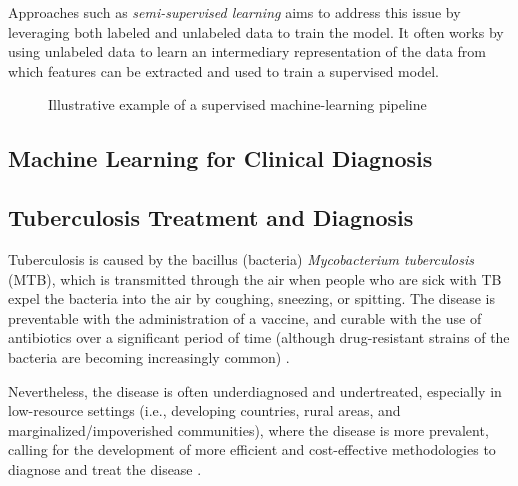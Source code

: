 \documentclass[../main.tex]{subfiles}
\begin{document}
     Approaches such as \textit{semi-supervised learning} aims to address this issue by leveraging both labeled and unlabeled data to train the model. It often works by using unlabeled data to learn an intermediary representation of the data from which features can be extracted and used to train a supervised model. 
    
     \begin{figure}
        \centering
        \resizebox*{1.1\columnwidth}{!}{
            \hspace*{-0.5cm}
            
        }
        \caption{Illustrative example of a supervised machine-learning pipeline}
        \label{fig:supervised_learning}
    \end{figure}


    \subsection{Machine Learning for Clinical Diagnosis}


    \subsection{Tuberculosis Treatment and Diagnosis} \label{sec:tuberculosis_data}

    Tuberculosis is caused by the bacillus (bacteria) \textit{Mycobacterium tuberculosis} (MTB), which is transmitted through the air when people who are sick with TB expel the bacteria into the air by coughing, sneezing, or spitting. The disease is preventable with the administration of a vaccine, and curable with the use of antibiotics over a significant period of time (although drug-resistant strains of the bacteria are becoming increasingly common) \cite{who_tuberculosis_2023}.
    
    Nevertheless, the disease is often underdiagnosed and undertreated, especially in low-resource settings (i.e., developing countries, rural areas, and marginalized/impoverished communities), where the disease is more prevalent, calling for the development of more efficient and cost-effective methodologies to diagnose and treat the disease \cite{who_global_2022, imi_era4tb_2020,  who_tuberculosis_2023}.
\end{document}
